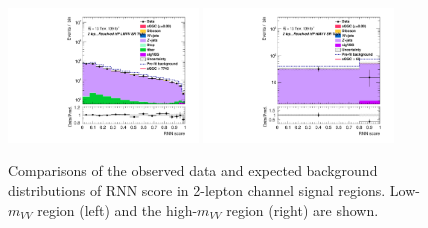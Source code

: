 \begin{figure}[]
    \includegraphics[width=0.45\textwidth]{figures/aQGC/PostFit/Region_distRNNScoreResolved_DSRVBSFidLMlljj1500_BMin0_T0_Y6051_incTag1_J2_L2_incJet1_GlobalFit_unconditionnal_mu1log}
    \includegraphics[width=0.45\textwidth]{figures/aQGC/PostFit/Region_distRNNScoreResolved_DSRVBSFidHMlljj1500_BMin0_T0_Y6051_incTag1_J2_L2_incJet1_GlobalFit_unconditionnal_mu1log}
    \caption{Comparisons of the observed data and expected background distributions of RNN score in 2-lepton channel signal regions. Low-$m_{VV}$ region (left) and the high-$m_{VV}$ region (right) are shown. }
    \label{fig:postSR2lepaQGC}
\end{figure}

